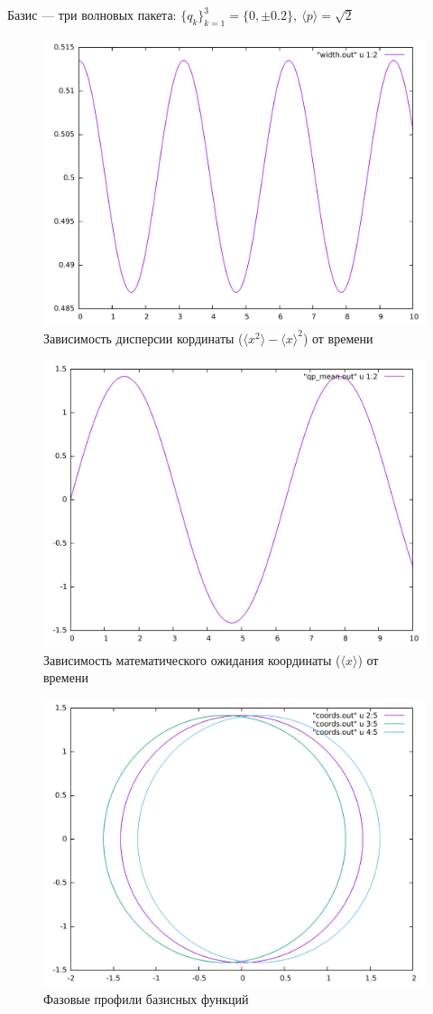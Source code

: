 \documentclass[a4paper,14pt]{extarticle}
\begin{document}
Базис --- три волновых пакета: $\{q_k\}_{k=1}^3 = \{0, \pm 0.2\},\ \langle p\rangle = \sqrt{2}$
\begin{figure}[H]
\centering
\includegraphics[scale = 0.5]{../all/images/width_2.pdf}
\caption{Зависимость дисперсии кординаты ($\langle x^2\rangle-\langle x\rangle^2$) от времени}
\end{figure}
\begin{figure}[H]
\centering
\includegraphics[scale = 0.5]{../all/images/mean_q_t_2.pdf}
\caption{Зависимость математического ожидания координаты ($\langle x\rangle$) от времени}
\end{figure}
\begin{figure}[H]
\centering
\includegraphics[scale = 0.5]{../all/images/phase_2.pdf}
\caption{Фазовые профили базисных функций}
\end{figure}
\end{document}
